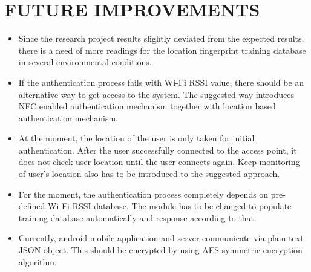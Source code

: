 \section{FUTURE IMPROVEMENTS}

\begin{itemize}
	\item Since the research project results slightly deviated from the expected results, there is a need of more readings for the location fingerprint training database in several environmental conditions.
	
	\item If the authentication process fails with Wi-Fi RSSI value, there should be an alternative way to get access to the system. The suggested way  introduces NFC enabled authentication mechanism together with location based authentication mechanism.
	
	\item At the moment, the location of the user is only taken for initial authentication. After the user successfully connected to the access point, it does not check user location until the user connects again. Keep monitoring of user's location also has to be introduced to the suggested approach.
	
	\item For the moment, the authentication process completely depends on pre-defined Wi-Fi RSSI database. The module has to be changed to populate training database automatically and response according to that. 
	
	\item Currently, android mobile application and server communicate via plain text JSON object. This should be encrypted by using AES symmetric encryption algorithm.
\end{itemize}
